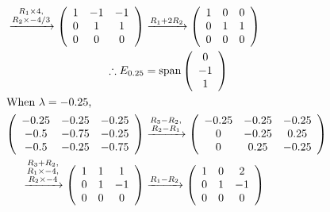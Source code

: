 \documentclass[12pt]{article}
\begin{document}
\begin{align*}
\xrightarrow{\substack{R_1 \times 4,\\R_2 \times -4/3}}
\left( \begin{array}{ccc} 
1 & -1 & -1\\
0 & 1 & 1\\
0 & 0 & 0\\
\end{array} \right)
&
\xrightarrow{\substack{R_1 + 2R_2}}
\left( \begin{array}{ccc} 
1 & 0 & 0\\
0 & 1 & 1\\
0 & 0 & 0\\
\end{array} \right)\\
\therefore E_{0.25} &= \text{span}
\left( \begin{array}{c} 
0\\
-1\\
1\\
\end{array} \right)\\
\intertext{When $\lambda = -0.25$,}
\left( \begin{array}{ccc} 
-0.25 & -0.25 & -0.25\\
-0.5 & -0.75 & -0.25\\
-0.5 & -0.25 & -0.75\\
\end{array} \right)
&
\xrightarrow{\substack{R_3 - R_2,\\R_2 - R_1}}
\left( \begin{array}{ccc} 
-0.25 & -0.25 & -0.25\\
0 & -0.25 & 0.25\\
0 & 0.25 & -0.25\\
\end{array} \right)\\
\xrightarrow{\substack{R_3 + R_2,\\R_1 \times -4,\\R_2 \times -4}}
\left( \begin{array}{ccc} 
1 & 1 & 1\\
0 & 1 & -1\\
0 & 0 & 0\\
\end{array} \right)
&
\xrightarrow{\substack{R_1 - R_2}}
\left( \begin{array}{ccc} 
1 & 0 & 2\\
0 & 1 & -1\\
0 & 0 & 0\\
\end{array} \right)\\

\end{align*}
\end{document}
